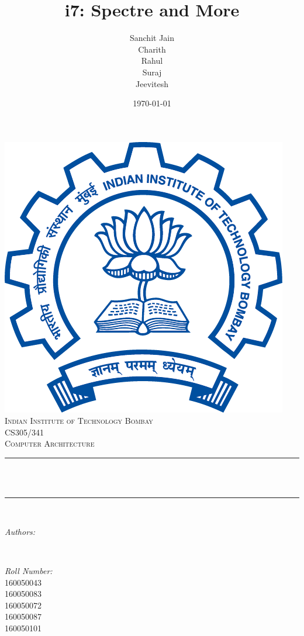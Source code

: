 \documentclass[12pt]{article}
\title{i7: Spectre and More}								%
\author{Sanchit Jain\\ Charith \\Rahul\\Suraj\\ Jeevitesh}								%
\date{\today}											%
\makeatletter
\let\thetitle\@title
\let\theauthor\@author
\let\thedate\@date
\makeatother
\begin{document}

\begin{titlepage}
	\centering
    \vspace*{0.5 cm}
    \includegraphics[scale = 0.25]{logo.png}\\[1.0 cm]	%
    \textsc{\LARGE Indian Institute of Technology Bombay}\\[2.0 cm]	%
	\textsc{\Large CS305/341}\\[0.5 cm]				%
	\textsc{\large  Computer Architecture}\\[0.5 cm]				%
	\rule{\linewidth}{0.2 mm} \\[0.4 cm]
	{ \huge \bfseries \thetitle}\\
	\rule{\linewidth}{0.2 mm} \\[1.5 cm]
	
	\begin{minipage}{0.4\textwidth}
		\begin{flushleft} \large
			\emph{Authors:}\\
			\theauthor
			\end{flushleft}
			\end{minipage}~
			\begin{minipage}{0.4\textwidth}
			\begin{flushright} \large
			\emph{Roll Number:} \\
			160050043\\
			160050083\\
			160050072\\
			160050087\\
			160050101\\%
		\end{flushright}
	\end{minipage}\\[2 cm]
	
	{\large \thedate}\\[2 cm]
 
	\vfill
	
\end{titlepage}
\end{document}
